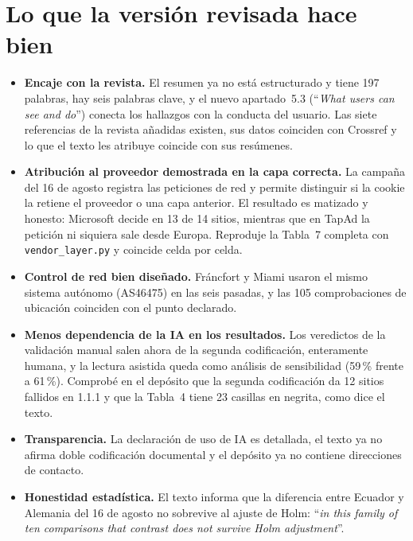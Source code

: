 \documentclass[11pt,a4paper]{article}
\newcommand{\cita}[1]{``\textit{#1}''}
\begin{document}
\section{Lo que la versi\'on revisada hace bien}

\begin{itemize}
	\item \textbf{Encaje con la revista.} El resumen ya no est\'a estructurado y tiene 197 palabras, hay seis palabras clave, y el nuevo apartado~5.3 (\cita{What users can see and do}) conecta los hallazgos con la conducta del usuario. Las siete referencias de la revista a\~nadidas existen, sus datos coinciden con Crossref y lo que el texto les atribuye coincide con sus res\'umenes.
	\item \textbf{Atribuci\'on al proveedor demostrada en la capa correcta.} La campa\~na del 16 de agosto registra las peticiones de red y permite distinguir si la cookie la retiene el proveedor o una capa anterior. El resultado es matizado y honesto: Microsoft decide en 13 de 14 sitios, mientras que en TapAd la petici\'on ni siquiera sale desde Europa. Reproduje la Tabla~7 completa con \texttt{vendor\_layer.py} y coincide celda por celda.
	\item \textbf{Control de red bien dise\~nado.} Fr\'ancfort y Miami usaron el mismo sistema aut\'onomo (AS46475) en las seis pasadas, y las 105 comprobaciones de ubicaci\'on coinciden con el punto declarado.
	\item \textbf{Menos dependencia de la IA en los resultados.} Los veredictos de la validaci\'on manual salen ahora de la segunda codificaci\'on, enteramente humana, y la lectura asistida queda como an\'alisis de sensibilidad (59\,\% frente a 61\,\%). Comprob\'e en el dep\'osito que la segunda codificaci\'on da 12 sitios fallidos en 1.1.1 y que la Tabla~4 tiene 23 casillas en negrita, como dice el texto.
	\item \textbf{Transparencia.} La declaraci\'on de uso de IA es detallada, el texto ya no afirma doble codificaci\'on documental y el dep\'osito ya no contiene direcciones de contacto.
	\item \textbf{Honestidad estad\'istica.} El texto informa que la diferencia entre Ecuador y Alemania del 16 de agosto no sobrevive al ajuste de Holm: \cita{in this family of ten comparisons that contrast does not survive Holm adjustment}.
\end{itemize}
\end{document}
